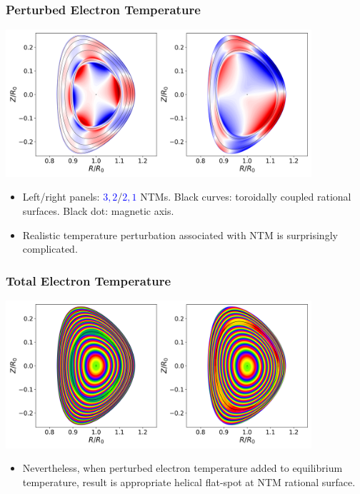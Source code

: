 \documentclass{beamer}
\begin{document}
\begin{frame}
\frametitle{Perturbed Electron Temperature}
 
\begin{center}
\includegraphics[width=0.85\textwidth]{../Fig13.png}
\end{center}
\begin{itemize}
\item Left/right panels: \textcolor{blue}{$3,2$}/\textcolor{blue}{$2,1$} NTMs. Black curves: toroidally coupled rational surfaces. Black dot: magnetic axis. 
\item Realistic temperature perturbation associated with NTM is surprisingly complicated.   
\end{itemize}
\end{frame}

\begin{frame}
\frametitle{Total Electron Temperature}
 
\begin{center}
\includegraphics[width=0.85\textwidth]{../Fig14.png}
\end{center}
\begin{itemize}
\item Nevertheless, when perturbed electron temperature added to equilibrium temperature, result is appropriate helical flat-spot at NTM rational surface. 
\end{itemize}
\end{frame}
\end{document}
